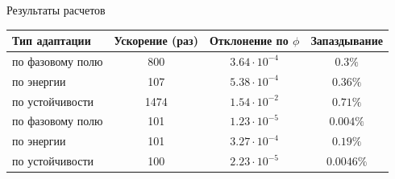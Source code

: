 \begin{frame}{Результаты расчетов}
\centering
\begin{tabular}{|l|c|c|c|}
	\hline
	Тип адаптации & Ускорение (раз) & Отклонение по $\phi$ & Запаздывание \\
	\hline \hline
	по фазовому полю	& 800	& $3.64 \cdot 10^{-4}$	& $0.3\%$		\\
	по энергии			& 107	& $5.38 \cdot 10^{-4}$	& $0.36\%$		\\
	по устойчивости		& 1474	& $1.54 \cdot 10^{-2}$	& $0.71\%$		\\
	\hline \hline
	по фазовому полю	& 101	& $1.23 \cdot 10^{-5}$	& $0.004\%$		\\
	по энергии			& 101	& $3.27 \cdot 10^{-4}$	& $0.19\%$		\\
	по устойчивости		& 100	& $2.23 \cdot 10^{-5}$	& $0.0046\%$	\\
	\hline
\end{tabular}
\end{frame}